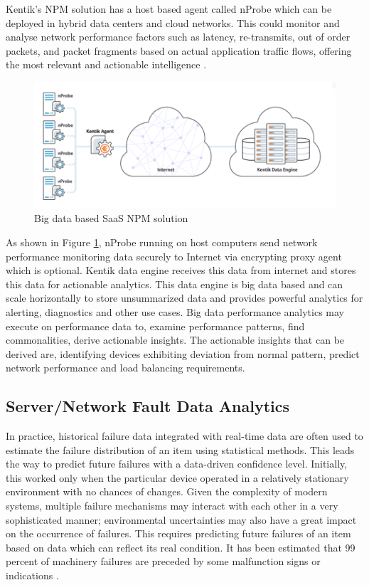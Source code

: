 \documentclass[sigconf]{acmart}
\begin{document}
Kentik's NPM solution has a host based agent called nProbe which can be deployed in hybrid data centers and cloud networks. This could monitor and analyse network performance factors such as latency, re-transmits, out of order packets, and packet fragments based on actual application traffic flows, offering the most relevant and actionable intelligence \cite{kentik-introduces-new-npm-solution}.

\begin{figure}[htb]
  \centering
  \includegraphics[width=1.0\textwidth]{images/Figure3.png}
  \caption{Big data based SaaS NPM solution 
  \cite{big-data-network-performance-monitoring}}
  \label{fig:Figure3} 
\end{figure}

As shown in Figure \ref{fig:Figure3}, nProbe running on host computers send network performance monitoring data securely to Internet via encrypting proxy agent which is optional. Kentik data engine receives this data from internet and stores this data for actionable analytics. This data engine is big data based and can scale horizontally to store unsummarized data and provides powerful analytics for alerting, diagnostics and other use cases. Big data performance analytics may execute on performance data to, examine performance patterns, find commonalities, derive actionable insights. The actionable insights that can be derived are, identifying devices exhibiting deviation from normal pattern, predict network performance and load balancing requirements.


\subsection{Server/Network Fault Data Analytics}

In practice, historical failure data integrated with real-time data are often used to estimate the failure distribution of an item using statistical methods. This leads the way to predict future failures with a data-driven confidence level. Initially, this worked only when the particular device operated in a relatively stationary environment with no chances of changes. Given the complexity of modern systems, multiple failure mechanisms may interact with each other in a very sophisticated manner; environmental uncertainties may also have a great impact on the occurrence of failures. This requires predicting future failures of an item based on data which can reflect its real condition. It has been estimated that 99 percent of machinery failures are
preceded by some malfunction signs or indications \cite{big-data-analytics-for-fault-detection}. 
\end{document}
